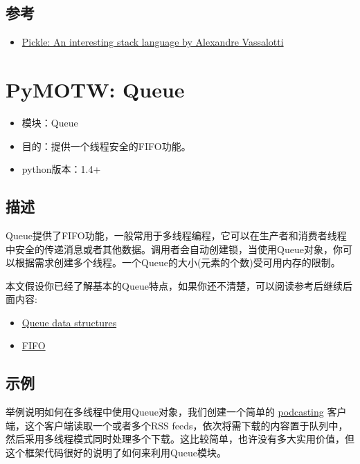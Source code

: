 \documentclass[letterpaper,10pt,english]{manual}
\begin{document}
\subsection{参考}
\begin{itemize}
\item {} 
\href{http://peadrop.com/blog/2007/06/18/pickle-an-interesting-stack-language/}{Pickle: An interesting stack language by Alexandre Vassalotti}

\end{itemize}

\resetcurrentobjects


\section{PyMOTW: Queue}
\begin{itemize}
\item {} 
模块：Queue

\item {} 
目的：提供一个线程安全的FIFO功能。

\item {} 
python版本：1.4+

\end{itemize}


\subsection{描述}

Queue提供了FIFO功能，一般常用于多线程编程，它可以在生产者和消费者线程中安全的传递消息或者其他数据。调用者会自动创建锁，当使用Queue对象，你可以根据需求创建多个线程。一个Queue的大小(元素的个数)受可用内存的限制。

本文假设你已经了解基本的Queue特点，如果你还不清楚，可以阅读参考后继续后面内容:
\begin{itemize}
\item {} 
\href{http://en.wikipedia.org/wiki/Queue\_\%28data\_structure}{Queue data structures}

\item {} 
\href{http://en.wikipedia.org/wiki/FIFO}{FIFO}

\end{itemize}


\subsection{示例}

举例说明如何在多线程中使用Queue对象，我们创建一个简单的 \href{http://en.wikipedia.org/wiki/Podcasting}{podcasting} 客户端，这个客户端读取一个或者多个RSS feeds，依次将需下载的内容置于队列中，然后采用多线程模式同时处理多个下载。这比较简单，也许没有多大实用价值，但这个框架代码很好的说明了如何来利用Queue模块。
\end{document}
